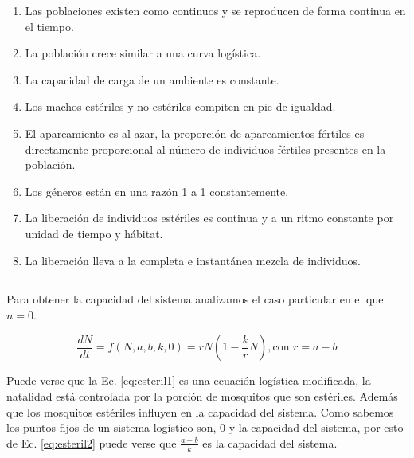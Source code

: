 \documentclass[twocolumn,aps,prl]{revtex4-1}
\newcommand*\sepline{%
  \begin{center}
    \rule[1ex]{.5\textwidth}{.5pt}
  \end{center}}
\begin{document}
\begin{enumerate}[label=\alph*)]
    \item Las poblaciones existen como continuos y se reproducen de forma continua en el tiempo.
    \item La población crece similar a una curva logística.
    \item La capacidad de carga de un ambiente es constante.
    \item Los machos estériles y no estériles compiten en pie de igualdad.
    \item El apareamiento es al azar, la proporción de apareamientos fértiles es directamente proporcional al número de individuos fértiles presentes en la población.
    \item Los géneros están en una razón 1 a 1 constantemente.
    \item La liberación de individuos estériles es continua y a un ritmo constante por unidad de tiempo y hábitat.
    \item La liberación lleva a la completa e instantánea mezcla de individuos.
\end{enumerate}

\sepline

Para obtener la capacidad del sistema analizamos el caso particular en el que $n=0$. 

\begin{equation}\label{eq:esteril2}
    \frac{d N}{d t} = f(N,a,b,k,0) 
    = 
    rN(1-\frac{k}{r}N)
    , \text{con } r = a-b
\end{equation}

Puede verse que la Ec. \ref{eq:esteril1} es una ecuación logística modificada, la natalidad está controlada por la porción de mosquitos que son estériles. Además que los mosquitos estériles influyen en la capacidad del sistema. Como sabemos los puntos fijos de un sistema logístico son, 0 y la capacidad del sistema, por esto de Ec. \ref{eq:esteril2} puede verse que $\frac{a-b}{k}$ es la capacidad del sistema.
\end{document}
